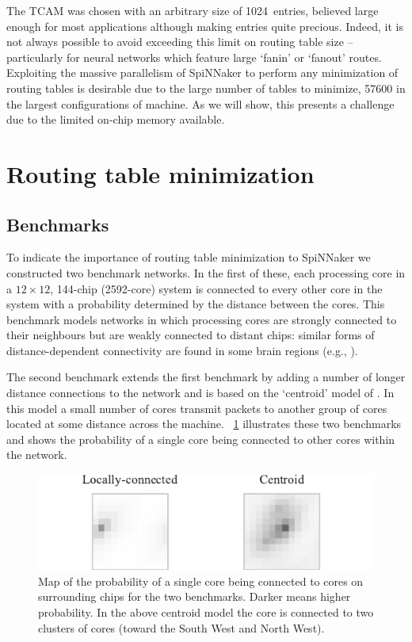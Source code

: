 \documentclass[conference]{IEEEtran}
\begin{document}
The TCAM was chosen with an arbitrary size of \num{1024}~entries, believed large enough for most applications although making entries quite precious.
Indeed, it is not always possible to avoid exceeding this limit on routing table size -- particularly for neural networks which feature large `fanin' or `fanout' routes.
Exploiting the massive parallelism of SpiNNaker to perform any minimization of routing tables is desirable due to the large number of tables to minimize, \num{57600} in the largest configurations of machine.
As we will show, this presents a challenge due to the limited on-chip memory available.

\section{Routing table minimization}

\subsection{Benchmarks}

To indicate the importance of routing table minimization to SpiNNaker we constructed two benchmark networks.
In the first of these, each processing core in a $12\times12$, 144-chip (\num{2592}-core) system is connected to every other core in the system with a probability determined by the distance between the cores.
This benchmark models networks in which processing cores are strongly connected to their neighbours but are weakly connected to distant chips:
similar forms of distance-dependent connectivity are found in some brain regions (e.g., \parencite{Hellwig2000}).

The second benchmark extends the first benchmark by adding a number of longer distance connections to the network and is based on the `centroid' model of \textcite{Navaridas2015}.
In this model a small number of cores transmit packets to another group of cores located at some distance across the machine.
\figurename~\ref{fig:experiment/setup} illustrates these two benchmarks and shows the probability of a single core being connected to other cores within the network.

\begin{figure}
  \centering
  \includegraphics{experiments/experiments.pdf}
  \caption{Map of the probability of a single core being connected to cores on surrounding chips for the two benchmarks. Darker means higher probability.
           In the above centroid model the core is connected to two clusters of cores (toward the South West and North West).}
  \label{fig:experiment/setup}
\end{figure}
\end{document}
